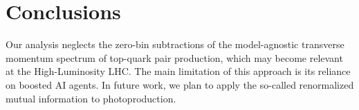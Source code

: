 \section{Conclusions}\label{sec:conclusions}

Our analysis neglects the zero-bin subtractions of the model-agnostic
transverse momentum spectrum of top-quark pair production, which may
become relevant at the High-Luminosity LHC. The main limitation of this
approach is its reliance on boosted AI agents. In future work, we plan
to apply the so-called renormalized mutual information to
photoproduction.

